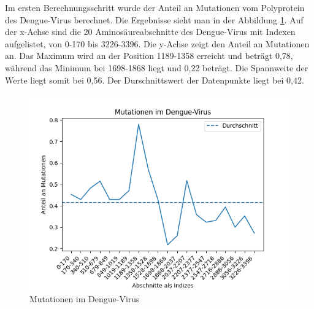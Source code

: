 \documentclass[german,version-2022-01]{uzl-thesis}
\begin{document}
Im ersten Berechnungsschritt wurde der Anteil an Mutationen vom Polyprotein des Dengue-Virus berechnet. Die Ergebnisse sieht man in der Abbildung \ref{fig:Dengue_virus_mutations}. Auf der x-Achse sind die 20 Aminos\"aureabschnitte des Dengue-Virus mit Indexen aufgelistet, von 0-170 bis 3226-3396. Die y-Achse zeigt den Anteil an Mutationen an. Das Maximum wird an der Position 1189-1358 erreicht und betr\"agt 0,78, w\"ahrend das Minimum bei 1698-1868 liegt und 0,22 betr\"agt. Die Spannweite der Werte liegt somit bei 0,56. Der Durschnittswert der Datenpunkte liegt bei 0,42. 
\begin{figure}[tbp]
  \centering
  \includegraphics[scale=0.75]{Images/Diagramm_Mutationen_im_Dengue_virus.png}
  \caption{Mutationen im Dengue-Virus}
  \label{fig:Dengue_virus_mutations}
\end{figure} 
\end{document}
